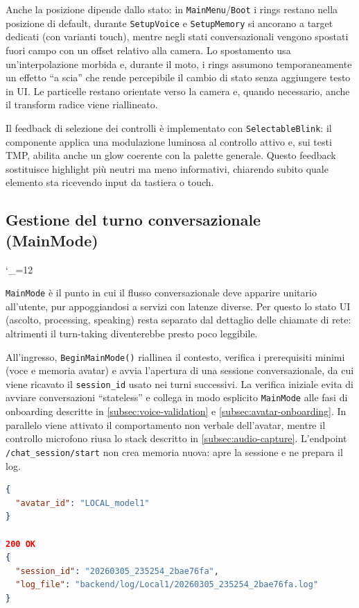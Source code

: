 Anche la posizione dipende dallo stato: in \texttt{MainMenu}/\texttt{Boot} i rings restano nella posizione di default, durante \texttt{SetupVoice} e \texttt{SetupMemory} si ancorano a target dedicati (con varianti touch), mentre negli stati conversazionali vengono spostati fuori campo con un offset relativo alla camera. Lo spostamento usa un'interpolazione morbida e, durante il moto, i rings assumono temporaneamente un effetto ``a scia'' che rende percepibile il cambio di stato senza aggiungere testo in UI. Le particelle restano orientate verso la camera e, quando necessario, anche il transform radice viene riallineato.

Il feedback di selezione dei controlli è implementato con \texttt{SelectableBlink}: il componente applica una modulazione luminosa al controllo attivo e, sui testi TMP, abilita anche un glow coerente con la palette generale. Questo feedback sostituisce highlight più neutri ma meno informativi, chiarendo subito quale elemento sta ricevendo input da tastiera o touch.
\endgroup

\subsection{Gestione del turno conversazionale (MainMode)} \label{subsec:mainmode}
\begingroup
\setlength{\emergencystretch}{3em}
\hfuzz=2000pt
\sloppy
\catcode`\_=12\relax

\texttt{MainMode} è il punto in cui il flusso conversazionale deve apparire unitario all'utente, pur appoggiandosi a servizi con latenze diverse. Per questo lo stato UI (ascolto, processing, speaking) resta separato dal dettaglio delle chiamate di rete: altrimenti il turn-taking diventerebbe presto poco leggibile.

All'ingresso, \texttt{BeginMainMode()} riallinea il contesto, verifica i prerequisiti minimi (voce e memoria avatar) e avvia l'apertura di una sessione conversazionale, da cui viene ricavato il \texttt{session\_id} usato nei turni successivi. La verifica iniziale evita di avviare conversazioni ``stateless'' e collega in modo esplicito \texttt{MainMode} alle fasi di onboarding descritte in \ref{subsec:voice-validation} e \ref{subsec:avatar-onboarding}. In parallelo viene attivato il comportamento non verbale dell'avatar, mentre il controllo microfono riusa lo stack descritto in \ref{subsec:audio-capture}. L'endpoint \texttt{/chat\_session/start} non crea memoria nuova: apre la sessione e ne prepara il log.

\begin{lstlisting}[language=json,style=sfpayload,title={POST /chat\_session/start},caption={Versione compatta dell'apertura di sessione usata dal client.}]
{
  "avatar_id": "LOCAL_model1"
}

200 OK
{
  "session_id": "20260305_235254_2bae76fa",
  "log_file": "backend/log/Local1/20260305_235254_2bae76fa.log"
}
\end{lstlisting}

